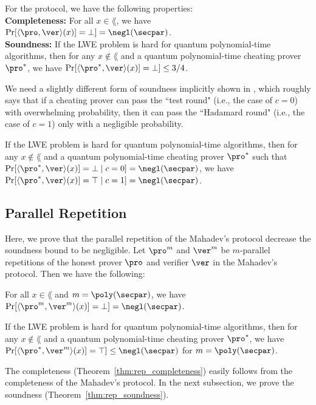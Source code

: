 For the protocol, we have the following properties:\\
\noindent\textbf{Completeness:}
For all $x\in \lang$, we have $\Pr[\langle \pro,\ver \rangle(x)]=\bot]= \negl(\secpar)$.\\
\noindent\textbf{Soundness:}
If the LWE problem is hard for quantum polynomial-time algorithms, then for any $x\notin \lang$ and a quantum polynomial-time cheating prover $\pro^*$, we have  $\Pr[\langle \pro^*,\ver \rangle(x)]=\bot]\leq 3/4$.

We need a slightly different form of soundness implicitly shown in \cite{FOCS:Mahadev18a}, which roughly says that if a cheating prover can pass the ``test round" (i.e., the case of $c=0$) with overwhelming probability, then it can pass the ``Hadamard round" (i.e., the case of $c=1$) only with a negligible probability. 
\begin{lemma}\label{lem:Mah_soundness}
If the LWE problem is hard for quantum polynomial-time algorithms, then for any $x\notin \lang$ and a quantum polynomial-time cheating prover $\pro^*$ such that  $\Pr[\langle \pro^*,\ver \rangle(x)]=\bot\mid c=0]=\negl(\secpar)$, we have $\Pr[\langle \pro^*,\ver \rangle(x)]=\top\mid c=1]=\negl(\secpar)$.
\end{lemma}

\subsection{Parallel Repetition}
Here, we prove that the parallel repetition of the Mahadev's protocol decrease the soundness bound to be negligible.
Let $\pro^m$ and $\ver^m$ be $m$-parallel repetitions of the honest prover $\pro$ and verifier $\ver$ in the Mahadev's protocol. Then we have the following:
\begin{theorem}[Completeness]\label{thm:rep_completeness}
For all $x\in \lang$ and $m= \poly(\secpar)$, we have $\Pr[\langle \pro^m,\ver^m \rangle(x)]=\bot]= \negl(\secpar)$.\\
\end{theorem}
\begin{theorem}[Soundness]\label{thm:rep_soundness}
If the LWE problem is hard for quantum polynomial-time algorithms, then for any $x\notin \lang$ and a quantum polynomial-time cheating prover $\pro^*$, we have  $\Pr[\langle \pro^*,\ver^m \rangle(x)]=\top]\leq \negl(\secpar)$ for $m=\poly(\secpar)$.
\end{theorem}

The completeness (Theorem~\ref{thm:rep_completeness}) easily follows from the completeness of the Mahadev's protocol.
In the next subsection, we prove the soundness (Theorem~\ref{thm:rep_soundness}).

